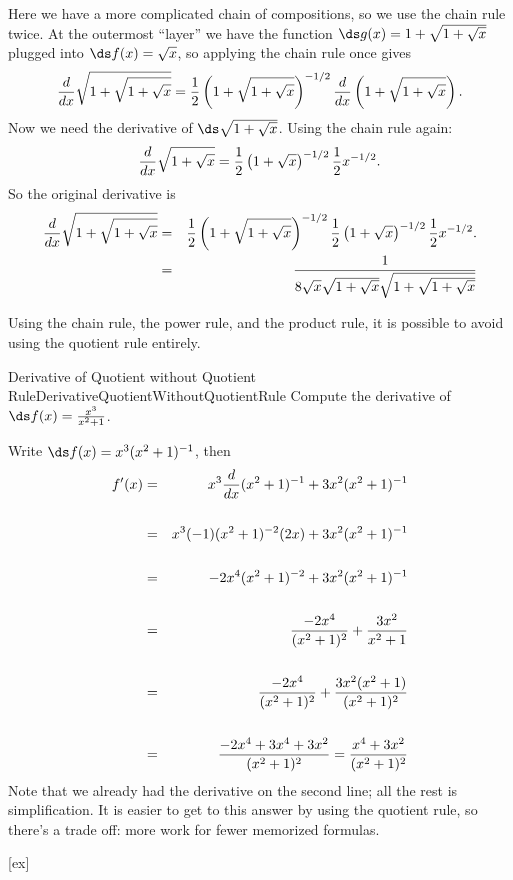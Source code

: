 \begin{solution} 
Here we have a
more complicated chain of compositions, so we use the chain rule
twice.
At the outermost ``layer'' we have the function
$\ds g(x)=1+\sqrt{1+\sqrt{x}}$ plugged into $\ds f(x)=\sqrt{x}$, so applying
the chain rule once gives 
$${d\over dx}\sqrt{1+\sqrt{1+\sqrt{x}}}=
{1\over 2}\left(1+\sqrt{1+\sqrt{x}}\right)^{-1/2}{d\over dx}
\left(1+\sqrt{1+\sqrt{x}}\right).$$
Now we need the derivative of $\ds \sqrt{1+\sqrt{x}}$. Using the chain
rule again:
$${d\over dx}\sqrt{1+\sqrt{x}}={1\over
  2}\left(1+\sqrt{x}\right)^{-1/2}{1\over 2}x^{-1/2}.$$
So the original derivative is 
\begin{eqnarray*}
{d\over dx}\sqrt{1+\sqrt{1+\sqrt{x}}}&=&
{1\over 2}\left(1+\sqrt{1+\sqrt{x}}\right)^{-1/2}
{1\over
  2}\left(1+\sqrt{x}\right)^{-1/2}{1\over 2}x^{-1/2}.\cr
&=&{1\over 8 \sqrt{x}\sqrt{1+\sqrt{x}}\sqrt{1+\sqrt{1+\sqrt{x}}}}
\end{eqnarray*}
\end{solution}

Using the chain rule, the power rule, and the product rule, it is
possible to avoid using the quotient rule entirely.

\begin{example}{Derivative of Quotient without Quotient Rule}{DerivativeQuotientWithoutQuotientRule}
Compute the derivative of $\ds f(x)={x^3\over x^2+1}$.
\end{example}

\begin{solution} 
Write 
$\ds f(x)=x^3(x^2+1)^{-1}$, then
\begin{eqnarray*}
f'(x)&=&x^3{d\over dx}(x^2+1)^{-1}+3x^2(x^2+1)^{-1}\cr
\\
&=&x^3(-1)(x^2+1)^{-2}(2x)+3x^2(x^2+1)^{-1}\cr
\\
&=&-2x^4(x^2+1)^{-2}+3x^2(x^2+1)^{-1}\cr
\\
&=&{-2x^4\over (x^2+1)^{2}}+{3x^2\over x^2+1}\cr
\\
&=&{-2x^4\over (x^2+1)^{2}}+{3x^2(x^2+1)\over (x^2+1)^{2}}\cr
\\
&=&{-2x^4+3x^4+3x^2\over (x^2+1)^{2}}={x^4+3x^2\over (x^2+1)^{2}}
\end{eqnarray*}
Note that we already had the derivative on the second line; all the
rest is simplification. It is easier to get to this answer by using
the quotient rule, so there's a trade off: more work for fewer
memorized formulas.
\end{solution}


[ex]
